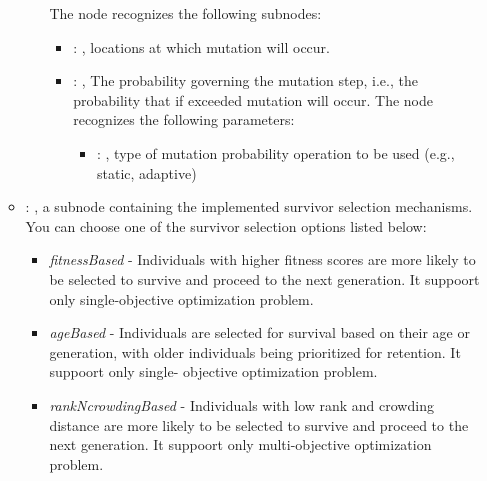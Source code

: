 \begin{itemize}
\begin{itemize}
\begin{itemize}
              The  node recognizes the following subnodes:
              \begin{itemize}
                \item {}: ,
                  locations at which mutation will occur.

                \item {}: ,
                  The probability governing the mutation step, i.e., the probability that if
                  exceeded mutation will occur.
                  The  node recognizes the following parameters:
                    \begin{itemize}
                      \item {}: ,
                        type of mutation probability operation to be used (e.g., static, adaptive)
                  \end{itemize}
              \end{itemize}
          \end{itemize}

        \item {}: ,
          a subnode containing the implemented survivor selection mechanisms. You can choose one of
          the survivor selection options listed below:                   \begin{itemize}
          \item \textit{fitnessBased} - Individuals with higher fitness scores are more likely to be
          selected to survive and                     proceed to the next generation. It suppoort
          only single-objective optimization problem.                     \item \textit{ageBased} -
          Individuals are selected for survival based on their age or generation, with older
          individuals being prioritized                     for retention. It suppoort only single-
          objective optimization problem.                     \item \textit{rankNcrowdingBased} -
          Individuals with low rank and crowding distance are more likely to be selected to survive
          and                     proceed to the next generation. It suppoort only multi-objective
          optimization problem.                   \end{itemize}


\end{itemize}
\end{itemize}
